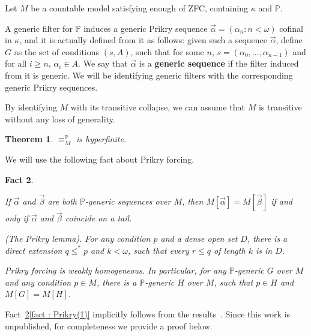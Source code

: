 \documentclass{amsart}
\newcommand{\markdef}[1]{\textbf{#1}}
\newenvironment{enumerate-(1)}{\begin{enumerate}[label={\upshape (\arabic*)}, leftmargin=2pc]}{\end{enumerate}}
\newtheorem{theorem}{Theorem}[section]
\newtheorem{fact}[theorem]{Fact}
\theoremstyle{definition}
\theoremstyle{remark}
\begin{document}
Let $M$ be a countable model satisfying enough of \textsf{ZFC}, containing $\kappa$ and $\mathbb{P}$.

A generic filter for $\mathbb{P}$ induces a generic Prikry sequence $\vec{\alpha}=(\alpha_n: n<\omega)$ cofinal in $\kappa$, and it is actually defined from it as follows: given such a sequence $\vec{\alpha}$, define $G$ as the set of conditions $( s, A)$, such that for some $n$, $s = ( \alpha_0, \dotsc, \alpha_{n-1})$ and for all $i\geq n$,  $\alpha_i\in A$.  We say that $\vec{\alpha}$ is a \markdef{generic sequence} if the filter induced from it is generic. We will be identifying generic filters with the corresponding generic Prikry sequences.


By identifying $M$ with its transitive collapse, we can assume that \(M\) is transitive without any loss of generality.


\begin{theorem}
\label{thm : Prikry}
$\equiv_{M}^\mathbb{P}$ is hyperfinite.
\end{theorem}

We will use the following fact about Prikry forcing.
\begin{fact}
\label{fact : Prikry}
\begin{enumerate-(1)}
\item
\label{fact : Prikry(1)}
If $\vec{\alpha}$ and $\vec{\beta}$ are both $\mathbb{P}$-generic sequences over $M$, then $M[\vec{\alpha}]=M[\vec{\beta}]$ if and only if $\vec{\alpha}$ and $\vec{\beta}$ coincide on a tail.
\item
\label{fact : Prikry(2)}
(The Prikry lemma). For any condition $p$ and a dense open set $D$, there is a direct extension $q\leq^*p$ and $k<\omega$, such that every $r\leq q$ of length $k$ is in $D$.
\item
Prikry forcing is weakly homogeneous. In particular, for any $\mathbb{P}$-generic $G$ over $M$ and any condition $p\in M$, there is a $\mathbb{P}$-generic $H$ over $M$, such that $p\in H$ and $M[G]=M[H]$.

\end{enumerate-(1)}
\end{fact}



Fact~\ref{fact : Prikry}\ref{fact : Prikry(1)} implicitly follows from the results~\cite{GitKanKoe}.
Since this work is unpublished, for completeness we provide a proof below.
\end{document}
